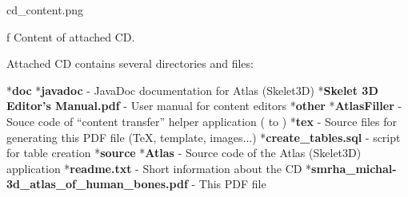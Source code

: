 \midinsert
\picw=8cm  \cinspic cd_content.png
\caption/f Content of attached CD.
\endinsert

Attached CD contains several directories and files:

\begitems
*{\bf doc}
\begitems
*{\bf javadoc} - JavaDoc  documentation for Atlas (Skelet3D)
*{\bf Skelet 3D Editor's Manual.pdf} - User manual for content editors
\enditems
*{\bf other}
\begitems
*{\bf AtlasFiller} - Souce code of “content transfer” helper application ( to )
*{\bf tex} - Source files for generating this PDF file (\TeX, template, images...)
*{\bf create\_tables.sql} -  script for table creation
\enditems
*{\bf source}
\begitems
*{\bf Atlas} - Source code of the Atlas (Skelet3D) application
\enditems
*{\bf readme.txt} - Short information about the CD
*{\bf smrha\_michal-3d\_atlas\_of\_human\_bones.pdf} - This PDF file
\enditems